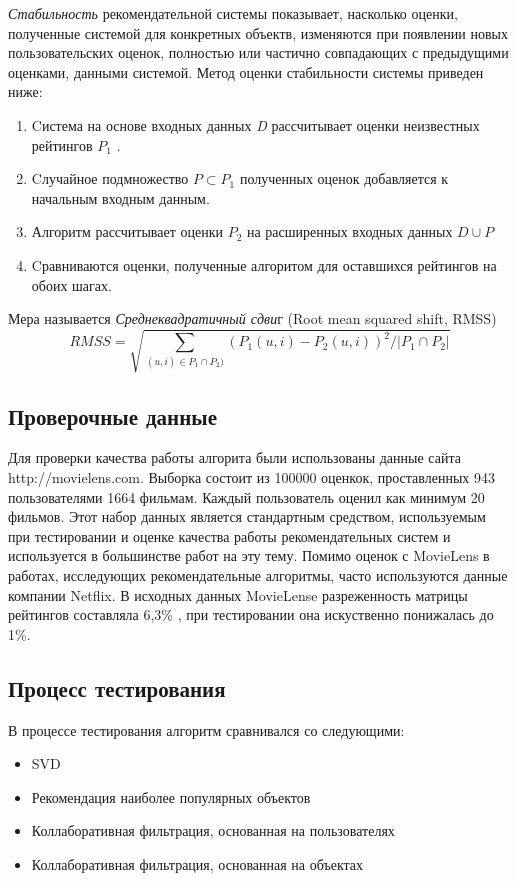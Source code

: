 \documentclass[12pt]{article} %
\begin{document}
\par
\textit{Стабильность} рекомендательной системы показывает, насколько оценки, полученные системой для конкретных объектв, изменяются при появлении новых пользовательских оценок, полностью или частично совпадающих с предыдущими оценками, данными системой. Метод оценки стабильности системы приведен ниже:
\begin{enumerate}

\item Cистема  на основе входных данных \textit{D} рассчитывает оценки неизвестных рейтингов $P_{1}$ . 
\item Cлучайное подмножество $P \subset P_{1}$ полученных оценок добавляется к начальным входным данным. 
\item Алгоритм рассчитывает оценки $P_{2}$  на расширенных входных данных $D \cup P$ 
\item Cравниваются оценки, полученные алгоритом для оставшихся рейтингов на обоих шагах. 
\end{enumerate}
Мера называется \textit{Среднеквадратичный сдви}г (Root mean squared shift, RMSS)
\[
	RMSS=\sqrt{\sum_{(u,i) \in P_{1} \cap P_{2})} (P_{1}(u,i) - P_{2}(u,i))^2 /  |P_{1} \cap P_{2}|}
\]  

\subsection{Проверочные данные}
Для проверки качества работы алгорита были использованы данные сайта\\ http://movielens.com. Выборка состоит из 100000 оценкок, проставленных  943 пользователями 1664 фильмам. Каждый пользователь оценил как минимум 20 фильмов. Этот набор данных является стандартным средством, используемым при тестировании и оценке качества работы рекомендательных систем и используется в большинстве работ на эту тему. Помимо оценок с MovieLens  в работах, исследующих рекомендательные алгоритмы, часто используются данные компании Netflix.
В исходных данных MovieLense разреженность матрицы рейтингов составляла 6,3\% , при тестировании она искуственно понижалась до 1\%.

\subsection{Процесс тестирования}
В процессе тестирования алгоритм сравнивался со следующими:
\begin{itemize}
\item SVD
\item Рекомендация наиболее популярных объектов
\item Коллаборативная фильтрация, основанная на пользователях
\item Коллаборативная фильтрация, основанная на объектах
\end{itemize}
\end{document}
